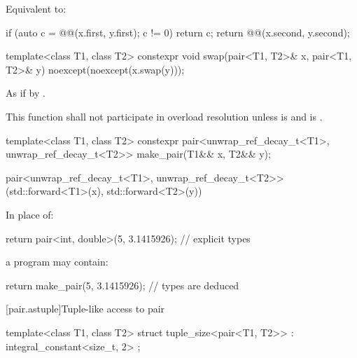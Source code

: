 \begin{itemdescr}
\pnum
\effects
Equivalent to:
\begin{codeblock}
if (auto c = @@(x.first, y.first); c != 0) return c;
return @@(x.second, y.second);
\end{codeblock}
\end{itemdescr}

%
\begin{itemdecl}
template<class T1, class T2>
  constexpr void swap(pair<T1, T2>& x, pair<T1, T2>& y) noexcept(noexcept(x.swap(y)));
\end{itemdecl}

\begin{itemdescr}
\pnum
\effects
As if by .

\pnum
\remarks
This function shall not participate in overload resolution unless
 is  and
 is .
\end{itemdescr}

%
\begin{itemdecl}
template<class T1, class T2>
  constexpr pair<unwrap_ref_decay_t<T1>, unwrap_ref_decay_t<T2>> make_pair(T1&& x, T2&& y);
\end{itemdecl}

\begin{itemdescr}
\pnum
\returns
\begin{codeblock}
pair<unwrap_ref_decay_t<T1>,
     unwrap_ref_decay_t<T2>>(std::forward<T1>(x), std::forward<T2>(y))
\end{codeblock}
\end{itemdescr}

\pnum
\begin{example}
In place of:
\begin{codeblock}
return pair<int, double>(5, 3.1415926);     // explicit types
\end{codeblock}
a \Cpp{} program may contain:
\begin{codeblock}
return make_pair(5, 3.1415926);             // types are deduced
\end{codeblock}
\end{example}

[pair.astuple]{Tuple-like access to pair}

%
\begin{itemdecl}
template<class T1, class T2>
  struct tuple_size<pair<T1, T2>> : integral_constant<size_t, 2> { };
\end{itemdecl}

